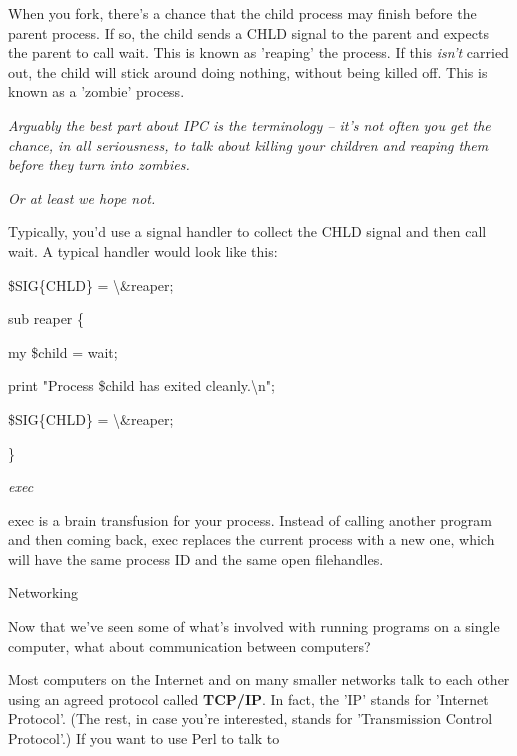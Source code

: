 \documentclass[a4paper,11pt]{book}
\begin{document}
\noindent When you fork, there's a chance that the child process may finish before the parent process. If so, the child sends a CHLD signal to the parent and expects the parent to call wait. This is known as 'reaping' the process. If this \textit{isn't }carried out, the child will stick around doing nothing, without being killed off. This is known as a 'zombie' process.

\noindent 

\noindent \textit{Arguably the best part about IPC is the terminology -- it's not often you get the chance, in all seriousness, to talk about killing your children and reaping them before they turn into zombies.}

\noindent \textit{Or at least we hope not.}

\noindent 

\noindent Typically, you'd use a signal handler to collect the CHLD signal and then call wait. A typical handler would look like this:

\noindent 

\noindent 

\noindent \$SIG\{CHLD\} = \textbackslash \&reaper;

\noindent sub reaper \{

\noindent my \$child = wait;

\noindent print "Process \$child has exited cleanly.\textbackslash n";

\noindent \$SIG\{CHLD\} = \textbackslash \&reaper;

\noindent \}

\noindent 

\noindent \textit{exec}

\noindent exec is a brain transfusion for your process. Instead of calling another program and then coming back, exec replaces the current process with a new one, which will have the same process ID and the same open filehandles.

\noindent 

\noindent Networking

\noindent 

\noindent Now that we've seen some of what's involved with running programs on a single computer, what about communication between computers?

\noindent 

\noindent Most  computers on the Internet  and  on many  smaller  networks  talk  to  each other  using  an agreed protocol  called \textbf{TCP/IP}. In  fact,  the  'IP'  stands  for  'Internet  Protocol'.  (The  rest,  in  case you're  interested,  stands for 'Transmission  Control  Protocol'.)  If  you  want to  use Perl  to  talk to
\end{document}

